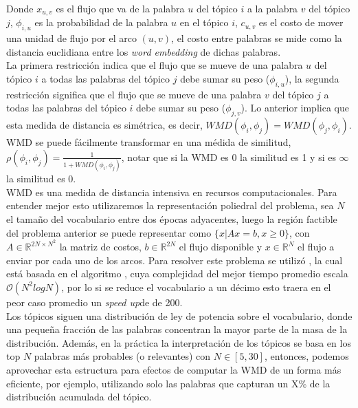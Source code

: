 \documentclass[letterpaper,12pt,oneside]{book} %
\begin{document}
Donde $x_{u,v}$ es el flujo que va de la palabra $u$ del tópico $i$ a la palabra $v$ del tópico $j$, $\phi_{i,u}$ es la probabilidad de la palabra $u$ en el tópico $i$, $c_{u,v}$ es el costo de mover una unidad de flujo por el arco $(u,v)$, el costo entre palabras se mide como la distancia euclidiana entre los \textit{word embedding} de dichas palabras.\\

La primera restricción indica que el flujo que se mueve de una palabra $u$ del tópico $i$ a todas las palabras del tópico $j$ debe sumar su peso ($\phi_{i,u}$), la segunda restricción significa que el flujo que se mueve de una palabra $v$ del tópico $j$ a todas las palabras del tópico $i$ debe sumar su peso ($\phi_{j,v}$). Lo anterior implica que esta medida de distancia es simétrica, es decir, $WMD(\phi_{i}, \phi_{j}) = WMD(\phi_{j}, \phi_{i})$.\\

WMD se puede fácilmente transformar en una médida de similitud, $\rho(\phi_{i}, \phi_{j}) = \frac{1}{1+WMD(\phi_{i}, \phi_{j})}$, notar que si la WMD es 0 la similitud es 1 y si es $\infty$ la similitud es 0. \\

WMD es una medida de distancia intensiva en recursos computacionales. Para entender mejor esto utilizaremos la representación poliedral del problema, sea $N$ el tamaño del vocabulario entre dos épocas adyacentes, luego la región factible del problema anterior se puede representar como $\{x| Ax=b, x\geq 0\}$, con $A\in \mathbb{R}^{2N\times N^{2}}$ la matriz de costos, $b\in \mathbb{R}^{2N}$ el flujo disponible y $x\in \mathbb{R}^{N}$ el flujo a enviar por cada uno de los arcos. Para resolver este problema se utilizó \citep{PyEMD}, la cual está basada en el algoritmo \citep{pele2009fast}, cuya complejidad del mejor tiempo promedio escala $\mathcal{O}(N^{2}log N)$, por lo si se reduce el vocabulario a un décimo esto traera en el peor caso promedio un \textit{speed up}de  de 200.\\

Los tópicos siguen una distribución de ley de potencia sobre el vocabulario, donde una pequeña fracción de las palabras concentran la mayor parte de la masa de la distribución. Además, en la práctica la interpretación de los tópicos se basa en los top $N$ palabras más probables (o relevantes) con $N \in [5, 30]$, entonces, podemos aprovechar esta estructura para efectos de computar la WMD de un forma más eficiente, por ejemplo, utilizando solo las palabras que capturan un X\% de la distribución acumulada del tópico.\\
\end{document}
